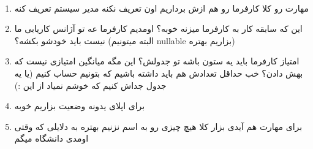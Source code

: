\documentclass{article}
\begin{document}
	\begin{center}

	\end{center}
	
	~\\
	\setlength{\tabcolsep}{64pt}
	
	\begin{enumerate}
		\item مهارت رو کلا کارفرما رو هم ازش برداریم اون تعریف نکنه مدیر سیستم تعریف کنه
		\item این که سابقه کار به کارفرما میزنه خوبه؟ اومدیم کارفرما عه تو آژانس کاریابی ما نیست باید خودشو بکشه؟ (البته میتونیم nullable بزاریم بهتره)
		\item  امتیاز کارفرما باید یه ستون باشه تو جدولش؟ این مگه میانگین امتیازی نیست که بهش دادن؟ خب حداقل تعدادش هم باید داشته باشیم که بتونیم حساب کنیم (یا یه جدول جداش کنیم که خوشم نمیاد از این :)
		\item برای اپلای یدونه وضعیت بزاریم خوبه
		\item برای مهارت هم آیدی بزار کلا هیچ چیزی رو به اسم نزنیم بهتره به دلایلی که وقتی اومدی دانشگاه میگم
	\end{enumerate}
	
	
\end{document}
